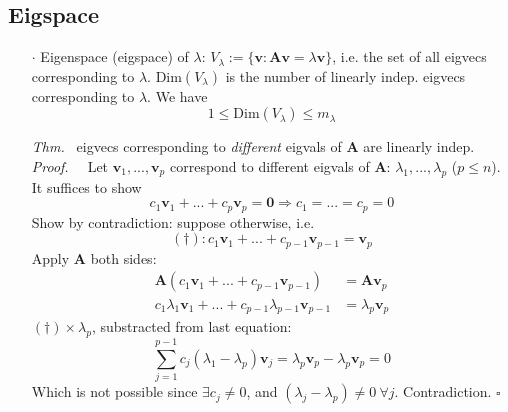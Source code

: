 \documentclass[a4paper, 11pt]{article}
\begin{document}
\subsection{Eigspace}
\begin{itemize}
  \item[$\cdot$] Eigenspace (eigspace) of $\lambda$: $V_{\lambda}:=\{\pmb{v}: \pmb{A}\pmb{v}=\lambda \pmb{v}\}$, i.e. the set of all eigvecs corresponding to $\lambda$. $\text{Dim}(V_{\lambda})$ is the number of linearly indep. eigvecs corresponding to $\lambda$. We have
  $$
  1\leq \text{Dim}(V_{\lambda})\leq m_{\lambda}
  $$
  \item[\textit{Thm.~}] eigvecs corresponding to \textit{different} eigvals of $\pmb{A}$ are linearly indep.\\
  \textit{Proof.~~} Let $\pmb{v}_1, ..., \pmb{v}_p$ correspond to different eigvals of $\pmb{A}$: $\lambda_1, ..., \lambda_p$ ($p\leq n$).\\
  It suffices to show
  $$
  c_1 \pmb{v}_1 + ... + c_p \pmb{v}_p= \pmb{0} \Rightarrow c_1=...=c_p=0
  $$
  Show by contradiction: suppose otherwise, i.e. 
  $$
  (\dag): c_1 \pmb{v}_1 + ... + c_{p-1} \pmb{v}_{p-1}= \pmb{v}_p
  $$
  Apply $\pmb{A}$ both sides:
  \begin{equation}
  \begin{split}
    \pmb{A}(c_1 \pmb{v}_1 + ... + c_{p-1} \pmb{v}_{p-1}) &= \pmb{A} \pmb{v}_p\\
    c_1 \lambda_1 \pmb{v}_1 + ... + c_{p-1} \lambda_{p-1} \pmb{v}_{p-1} &= \lambda_p \pmb{v}_p
  \end{split}
  \end{equation}
  $(\dag)\times \lambda_p$, substracted from last equation:
  $$
  \sum_{j=1}^{p-1}c_j (\lambda_1 - \lambda_p)\pmb{v}_j = \lambda_p \pmb{v}_p - \lambda_p \pmb{v}_p = 0
  $$
  Which is not possible since $\exists c_j \ne 0$, and $(\lambda_j - \lambda_p)\ne 0~\forall j$. Contradiction. $\square$
\end{itemize}
\end{document}
